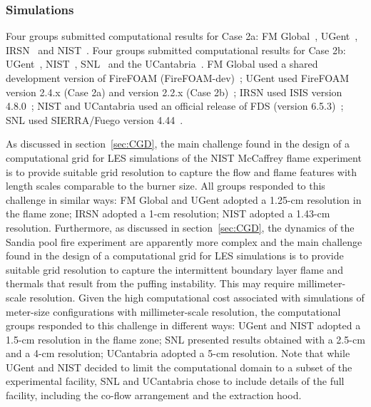 \subsubsection{Simulations}

Four groups submitted computational results for Case 2a: FM Global~\cite{Case2a_SIM_FMG}, UGent~\cite{Case2a_SIM_UGent}, IRSN~\cite{Case2a_SIM_IRSN} and NIST~\cite{Case2a_SIM_NIST}. Four groups submitted computational results for Case 2b: UGent~\cite{Case2b_SIM_UGent}, NIST~\cite{Case2b_SIM_NIST}, SNL~\cite{Case2b_SIM_SNL} and the UCantabria~\cite{Case2b_SIM_UCantabria}. FM Global used a shared development version of FireFOAM (FireFOAM-dev)~\cite{FireFOAM}; UGent used FireFOAM version 2.4.x (Case 2a) and version  2.2.x (Case 2b)~\cite{FireFOAM}; IRSN used ISIS version 4.8.0~\cite{ISIS}; NIST and UCantabria used an official release of FDS (version 6.5.3)~\cite{FDS}; SNL used SIERRA/Fuego version 4.44~\cite{SIERRA/Fuego}.

As discussed in section~\ref{sec:CGD}, the main challenge found in the design of a computational grid for LES simulations of the NIST McCaffrey flame experiment is to provide suitable grid resolution to capture the flow and flame features with length scales comparable to the burner size. All groups responded to this challenge in similar ways: FM Global and UGent adopted a 1.25-cm resolution in the flame zone; IRSN adopted a 1-cm resolution; NIST adopted a 1.43-cm resolution. Furthermore, as discussed in section~\ref{sec:CGD}, the dynamics of the Sandia pool fire experiment are apparently more complex and the main challenge found in the design of a computational grid for LES simulations is to provide suitable grid resolution to capture the intermittent boundary layer flame and thermals that result from the puffing instability. This may require millimeter-scale resolution. Given the high computational cost associated with simulations of meter-size configurations with millimeter-scale resolution, the computational groups responded to this challenge in different ways: UGent and NIST adopted a 1.5-cm resolution in the flame zone; SNL presented results obtained with a 2.5-cm and a 4-cm resolution; UCantabria adopted a 5-cm resolution. Note that while UGent and NIST decided to limit the computational domain to a subset of the experimental facility, SNL and UCantabria chose to include details of the full facility, including the co-flow arrangement and the extraction hood.

